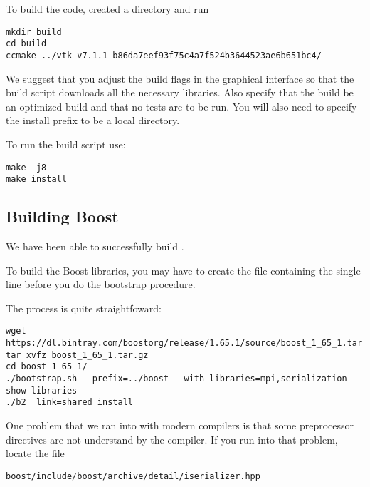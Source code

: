 \documentclass[11pt,fleqn]{book} %
\begin{document}
To build the code, created a  directory and run
\begin{lstlisting}[backgroundcolor=\color{background}]
mkdir build
cd build
ccmake ../vtk-v7.1.1-b86da7eef93f75c4a7f524b3644523ae6b651bc4/
\end{lstlisting}

We suggest that you adjust the build flags in the  graphical interface so that
the build script downloads all the necessary libraries. Also specify that the build be an optimized build 
and that no tests are to be run.  You will also need to specify the install prefix to be a local 
 directory.

To run the build script use:
\begin{lstlisting}[backgroundcolor=\color{background}]
make -j8
make install
\end{lstlisting}

\subsection{Building Boost}

We have been able to successfully build .  
\begin{WarningBox}
To build the Boost  libraries, you may have to create the file
 containing the single line  
before you do the bootstrap procedure.
\end{WarningBox}

The process is quite straightfoward:
\begin{lstlisting}[backgroundcolor=\color{background}]
wget https://dl.bintray.com/boostorg/release/1.65.1/source/boost_1_65_1.tar.gz
tar xvfz boost_1_65_1.tar.gz
cd boost_1_65_1/
./bootstrap.sh --prefix=../boost --with-libraries=mpi,serialization --show-libraries
./b2  link=shared install
\end{lstlisting}

One problem that we ran into with modern compilers is that some preprocessor directives are 
not understand by the compiler.  If you run into that problem, locate the file
\begin{lstlisting}[backgroundcolor=\color{background}]
boost/include/boost/archive/detail/iserializer.hpp
\end{lstlisting}
\end{document}
